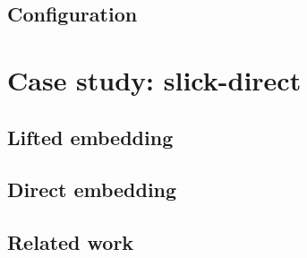 \documentclass[xcolor=dvipsnames]{beamer}
\theoremstyle{definition}
\begin{document}

\subsection{Configuration} %
\label{sub:Directembeddingconfiguration}




\section{Case study: slick-direct} %
\label{sec:Slick-direct}
\subsection{Lifted embedding} %
\label{sub:Liftedembedding}


\subsection{Direct embedding} %
\label{sub:Direct embedding}


\subsection{Related work} %
\label{sub:Related work}

\end{document}

